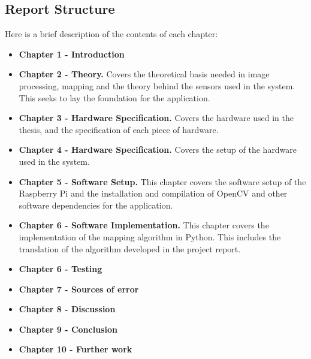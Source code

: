 \newpage

\subsection{Report Structure}
Here is a brief description of the contents of each chapter:

\begin{itemize}
\item \textbf{Chapter 1 - Introduction}
\item \textbf{Chapter 2 - Theory.} Covers the theoretical basis needed in image processing, mapping and the theory behind the sensors used in the system. This seeks to lay the foundation for the application.
\item \textbf{Chapter 3 - Hardware Specification.} Covers the hardware used in the thesis, and the specification of each piece of hardware. 
\item \textbf{Chapter 4 - Hardware Specification.} Covers the setup of the hardware used in the system. 
\item \textbf{Chapter 5 - Software Setup.} This chapter covers the software setup of the Raspberry Pi and the installation and compilation of OpenCV and other software dependencies for the application.
\item \textbf{Chapter 6 - Software Implementation.} This chapter covers the implementation of the mapping algorithm in Python. This includes the translation of the algorithm developed in the project report\cite{kris}.
\item \textbf{Chapter 6 - Testing}
\item \textbf{Chapter 7 - Sources of error}
\item \textbf{Chapter 8 - Discussion}
\item \textbf{Chapter 9 - Conclusion}
\item \textbf{Chapter 10 - Further work}
\end{itemize}



